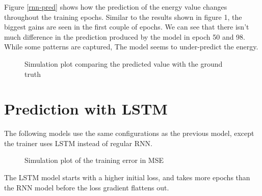 \documentclass[a4paper, article, oneside, USenglish, IN5460]{memoir}
\begin{document}
Figure \ref{rnn-pred} shows how the prediction of the energy value changes throughout the training epochs. Similar to the results shown in figure 1, the biggest gains are seen in the first couple of epochs. We can see that there isn't much difference in the prediction produced by the model in epoch 50 and 98. While some patterns are captured, The model seems to under-predict the energy.


\begin{figure}[H]
  \centering
    
  \caption{Simulation plot comparing the predicted value with the ground truth}
\end{figure}




\section{Prediction with LSTM}

The following models use the same configurations as the previous model, except the trainer uses LSTM instead of regular RNN.

\begin{figure}[H]
  \centering
    
  \caption{Simulation plot of the training error in MSE}
\end{figure}

The LSTM model starts with a higher initial loss, and takes more epochs than the RNN model before the loss gradient flattens out.
\end{document}
